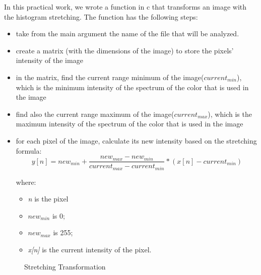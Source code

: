 \documentclass{article}
\begin{document}
	In this practical work, we wrote a function in c that transforms an image with the histogram stretching. The function has the following steps:
	\begin{itemize}
  		\item take from the main argument the name of the file that will be analyzed.
  		\item create a matrix (with the dimensions of the image) to store the pixels' intensity of the image
  		\item in the matrix, find the current range minimum of the image({\it $current_{min}$}), which is the minimum intensity of the spectrum of the color 			that is used in the image
  		\item find also the current range maximum of the image({\it $current_{max}$}), which is the maximum intensity of the spectrum of the color that is 			used in the image
  		\item for each pixel of the image, calculate its new intensity based on the stretching formula:
		\begin{equation}
			y[n]=new_{min}+\frac{new_{max}-new_{min}}{current_{max}-current_{min}}*(x[n]-current_{min})
			\label{eq:stretching}
		\end{equation}
	
		where: 
			\begin{itemize}
	  			\item {\it n} is the pixel		
	  			\item {\it $new_{min}$} is 0;
	  			\item {\it $new_{max}$} is 255; 
	  			\item {\it x[n]} is the current intensity of the pixel.
			\end{itemize}
	\end{itemize}

	\begin{figure}[H]
	\centering
	\caption{Stretching Transformation}
	\label{fig:stretching}
	\end{figure}
\end{document}

